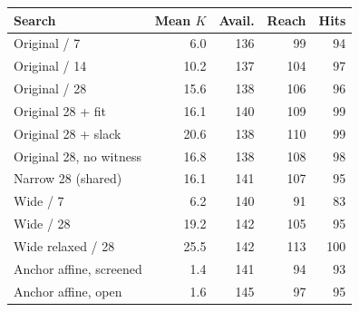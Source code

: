 \begin{tabular}{@{}lrrrr@{}}
\toprule
Search & Mean $K$ & Avail. & Reach & Hits \\
\midrule
Original / 7 & 6.0 & 136 & 99 & 94 \\
Original / 14 & 10.2 & 137 & 104 & 97 \\
Original / 28 & 15.6 & 138 & 106 & 96 \\
Original 28 + fit & 16.1 & 140 & 109 & 99 \\
Original 28 + slack & 20.6 & 138 & 110 & 99 \\
Original 28, no witness & 16.8 & 138 & 108 & 98 \\
Narrow 28 (shared) & 16.1 & 141 & 107 & 95 \\
Wide / 7 & 6.2 & 140 & 91 & 83 \\
Wide / 28 & 19.2 & 142 & 105 & 95 \\
Wide relaxed / 28 & 25.5 & 142 & 113 & 100 \\
Anchor affine, screened & 1.4 & 141 & 94 & 93 \\
Anchor affine, open & 1.6 & 145 & 97 & 95 \\
\bottomrule
\end{tabular}
